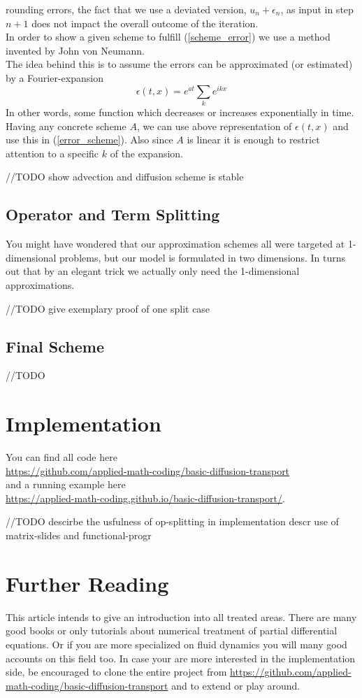\documentclass[]{article}
\begin{document}
rounding errors, the fact that we use a deviated version, $u_{n}+\epsilon_{n}$, as input in
step $n+1$ does not impact the overall outcome of the iteration.\\
In order to show a given scheme to fulfill (\ref{scheme_error}) we use a method invented by John von Neumann.\\
The idea behind this is to assume the errors can be approximated (or estimated) by a Fourier-expansion
\begin{equation} \label{error_fourier_exp}
\epsilon(t,x)=e^{at}\sum_{k}e^{ikx}
\end{equation}
In other words, some function which decreases or increases exponentially in time. Having any concrete scheme $A$, we can use above representation of $\epsilon(t,x)$ and use this in (\ref{error_scheme}). Also since $A$ is linear it is enough to restrict attention to a specific $k$ of the expansion.

//TODO show advection and diffusion scheme is stable
 

\subsection{Operator and Term Splitting}
You might have wondered that our approximation schemes all were targeted at 1-dimensional problems, but our model is formulated in two dimensions. In turns out that by an elegant trick
we actually only need the 1-dimensional approximations.

//TODO give exemplary proof of one split case

\subsection{Final Scheme}

//TODO

\section{Implementation}
You can find all code here \\ \url{https://github.com/applied-math-coding/basic-diffusion-transport} \\ and
a running example here \\
 \url{https://applied-math-coding.github.io/basic-diffusion-transport/}.

//TODO
descirbe the usfulness of op-splitting in implementation
descr use of matrix-slides and functional-progr

\section{Further Reading}
This article intends to give an introduction into all treated areas.
There are many good books or only tutorials about numerical treatment of partial
differential equations. Or if you are more specialized on fluid dynamics you will
many good accounts on this field too. In case your are more interested in the 
implementation side, be encouraged to clone the entire project from
\url{https://github.com/applied-math-coding/basic-diffusion-transport} and to extend or play around.
\end{document}
